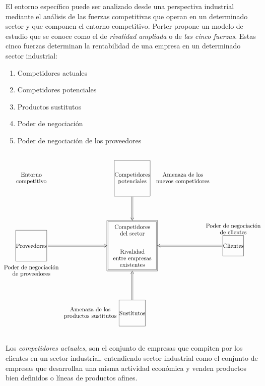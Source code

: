 \documentclass[10pt,a4paper,spanish]{report}
\begin{document}
            El entorno específico puede ser analizado desde una perspectiva industrial mediante el análisis de las fuerzas competitivas que operan en un determinado sector y que componen el entorno competitivo. Porter propone un modelo de estudio que se conoce como el de \textit{\textcolor[rgb]{0.3,0.4,0.6}{rivalidad ampliada}} o de \textit{\textcolor[rgb]{0.3,0.4,0.6}{las cinco fuerzas}}. Estas cinco fuerzas determinan la rentabilidad de una empresa en un determinado sector industrial:
            \begin{enumerate}
                  \item Competidores actuales
                  \item Competidores potenciales
                  \item Productos sustitutos
                  \item Poder de negociación
                  \item Poder de negociación de los proveedores
            \end{enumerate}
            \[\begin{xy}
            ,(0,0)*+=[F=]=<6cm>\txt<3cm>{Competidores del sector \\ \\ \\ Rivalidad entre empresas\\existentes}
            ,(0,-40)*+=[F]=<3cm>\txt{Sustitutos}
            ,(-25,-40)*+=[]=<3cm>\txt{Amenaza de los\\productos sustitutos}
            ,(0,40)*+=[F]=<3cm>\txt{Competidores\\potenciales}
            ,(30,40)*+=[]=<3cm>\txt{Amenaza de los\\nuevos competidores}
            ,(60,0)*+=[F]=<3cm>\txt{Clientes}
            ,(60,10)*+=[]=<3cm>\txt{Poder de negociación\\de clientes}
            ,(-60,0)*+=[F]=<3cm>\txt{Proveedores}
            ,(-60,-15)*+=[]=<3cm>\txt{Poder de negociación\\de proveedores}
            ,(-60,40)*+=[]=<3cm>\txt{Entorno\\competitivo}
            \ar@{=>} (0,-32);(0,-15)
            \ar@{=>} (53,0);(15,0)
            \ar@{=>} (-50,0);(-15,0)
            \ar@{=>} (0,29);(0,15)
            \end{xy}\]
            \newpage
            Los \textit{\textcolor[rgb]{0.3,0.4,0.6}{competidores actuales}}, son el conjunto de empresas que compiten por los clientes en un sector industrial, entendiendo sector industrial como el conjunto de empresas que desarrollan una misma actividad económica y venden productos bien definidos o líneas de productos afines.
\end{document}
